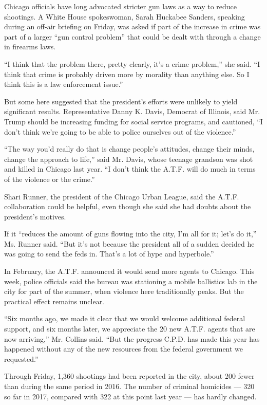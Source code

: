 Chicago officials have long advocated stricter gun laws as a way to
reduce shootings. A White House spokeswoman, Sarah Huckabee Sanders,
speaking during an off-air briefing on Friday, was asked if part of the
increase in crime was part of a larger ``gun control problem'' that
could be dealt with through a change in firearms laws.

``I think that the problem there, pretty clearly, it's a crime
problem,'' she said. ``I think that crime is probably driven more by
morality than anything else. So I think this is a law enforcement
issue.''

But some here suggested that the president's efforts were unlikely to
yield significant results. Representative Danny K. Davis, Democrat of
Illinois, said Mr. Trump should be increasing funding for social service
programs, and cautioned, ``I don't think we're going to be able to
police ourselves out of the violence.''

``The way you'd really do that is change people's attitudes, change
their minds, change the approach to life,'' said Mr. Davis, whose
teenage grandson was shot and killed in Chicago last year. ``I don't
think the A.T.F. will do much in terms of the violence or the crime.''

Shari Runner, the president of the Chicago Urban League, said the A.T.F.
collaboration could be helpful, even though she said she had doubts
about the president's motives.

If it ``reduces the amount of guns flowing into the city, I'm all for
it; let's do it,'' Ms. Runner said. ``But it's not because the president
all of a sudden decided he was going to send the feds in. That's a lot
of hype and hyperbole.''

In February, the A.T.F. announced it would send more agents to Chicago.
This week, police officials said the bureau was stationing a mobile
ballistics lab in the city for part of the summer, when violence here
traditionally peaks. But the practical effect remains unclear.

``Six months ago, we made it clear that we would welcome additional
federal support, and six months later, we appreciate the 20 new A.T.F.
agents that are now arriving,'' Mr. Collins said. ``But the progress
C.P.D. has made this year has happened without any of the new resources
from the federal government we requested.''

Through Friday, 1,360 shootings had been reported in the city, about 200
fewer than during the same period in 2016. The number of criminal
homicides --- 320 so far in 2017, compared with 322 at this point last
year --- has hardly changed.

